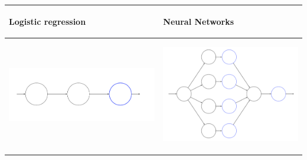 \documentclass{article}
\begin{document}
\begin{tabular}{p{210pt}|p{210pt}}
\begin{center}{\LARGE
\textbf{Logistic regression}
}\end{center} 
& 
\begin{center} 
{\LARGE
\textbf{Neural Networks}
}
\end{center}
 \\
\hline
\vspace{30pt}
\hspace{-30pt}
\includegraphics[scale=0.4]{logistic_color_no_expression.png}  
&
\begin{center}
\includegraphics[scale=0.4]{nn_color_no_expression.png}
\end{center}


\end{tabular}
\end{document}

